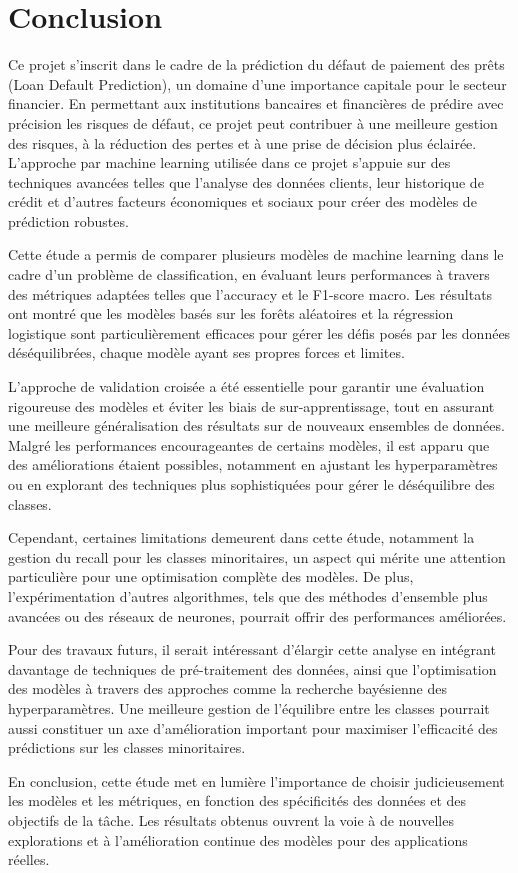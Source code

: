 \clearpage
\chapter*{Conclusion}
Ce projet s'inscrit dans le cadre de la prédiction du défaut de paiement des prêts (Loan Default Prediction), un domaine d'une importance capitale pour le secteur financier. En permettant aux institutions bancaires et financières de prédire avec précision les risques de défaut, ce projet peut contribuer à une meilleure gestion des risques, à la réduction des pertes et à une prise de décision plus éclairée. L'approche par machine learning utilisée dans ce projet s'appuie sur des techniques avancées telles que l'analyse des données clients, leur historique de crédit et d'autres facteurs économiques et sociaux pour créer des modèles de prédiction robustes.

Cette étude a permis de comparer plusieurs modèles de machine learning dans le cadre d'un problème de classification, en évaluant leurs performances à travers des métriques adaptées telles que l'accuracy et le F1-score macro. Les résultats ont montré que les modèles basés sur les forêts aléatoires et la régression logistique sont particulièrement efficaces pour gérer les défis posés par les données déséquilibrées, chaque modèle ayant ses propres forces et limites.

L'approche de validation croisée a été essentielle pour garantir une évaluation rigoureuse des modèles et éviter les biais de sur-apprentissage, tout en assurant une meilleure généralisation des résultats sur de nouveaux ensembles de données. Malgré les performances encourageantes de certains modèles, il est apparu que des améliorations étaient possibles, notamment en ajustant les hyperparamètres ou en explorant des techniques plus sophistiquées pour gérer le déséquilibre des classes.

Cependant, certaines limitations demeurent dans cette étude, notamment la gestion du recall pour les classes minoritaires, un aspect qui mérite une attention particulière pour une optimisation complète des modèles. De plus, l'expérimentation d'autres algorithmes, tels que des méthodes d'ensemble plus avancées ou des réseaux de neurones, pourrait offrir des performances améliorées.

Pour des travaux futurs, il serait intéressant d'élargir cette analyse en intégrant davantage de techniques de pré-traitement des données, ainsi que l'optimisation des modèles à travers des approches comme la recherche bayésienne des hyperparamètres. Une meilleure gestion de l'équilibre entre les classes pourrait aussi constituer un axe d'amélioration important pour maximiser l'efficacité des prédictions sur les classes minoritaires.

En conclusion, cette étude met en lumière l'importance de choisir judicieusement les modèles et les métriques, en fonction des spécificités des données et des objectifs de la tâche. Les résultats obtenus ouvrent la voie à de nouvelles explorations et à l'amélioration continue des modèles pour des applications réelles.


